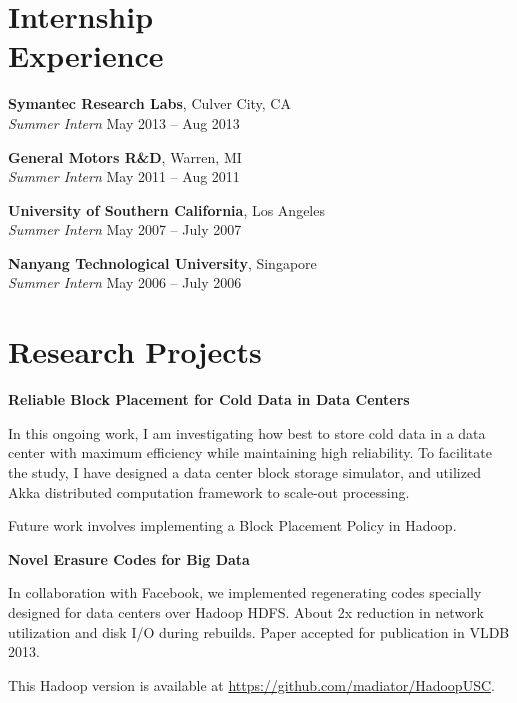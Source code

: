 \documentclass[margin,line]{resume}
\begin{document}
\begin{resume}
\section{\mysidestyle Internship\\Experience}

    \textbf{Symantec Research Labs}, Culver City, CA\\
    \textsl{Summer Intern} \hfill May 2013 -- Aug 2013
	
    \textbf{General Motors R\&D}, Warren, MI\\
    \textsl{Summer Intern} \hfill May 2011 -- Aug 2011

    \textbf{University of Southern California}, Los Angeles\\%
    \textsl{Summer Intern} \hfill May 2007 -- July 2007

    \textbf{Nanyang Technological University}, Singapore \\%
    \textsl{Summer Intern} \hfill May 2006 -- July 2006

\section{\mysidestyle Research Projects}
  \textbf{Reliable Block Placement for Cold Data in Data Centers} 
  \begin{list2}
  \item In this ongoing work, I am investigating how best to store cold data in a data center with maximum efficiency while maintaining high reliability. To facilitate the study, I have designed a data center block storage simulator, and utilized Akka distributed computation framework to scale-out processing.
  \item Future work involves implementing a Block Placement Policy in Hadoop.
  \end{list2} 

\newpage
	
	\textbf{Novel Erasure Codes for Big Data}
  \begin{list2}
   \item In collaboration with Facebook, we implemented regenerating codes specially designed for data centers over Hadoop HDFS. About 2x reduction in network utilization and disk I/O during rebuilds. Paper accepted for publication in VLDB 2013.
   \item This Hadoop version is available at \href{https://github.com/madiator/HadoopUSC}{https://github.com/madiator/HadoopUSC}. 
  \end{list2}
	

\end{resume}
\end{document}
